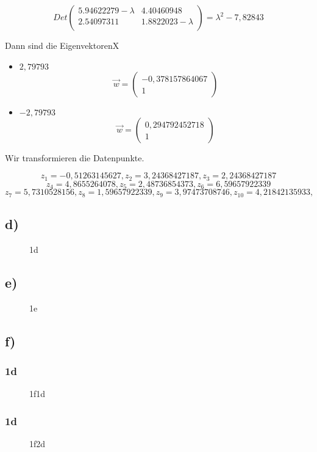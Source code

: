 \documentclass[a4paper,parskip=full-]{article}
\begin{document}
$$
Det\left(
\begin{array}{cc}
 5.94622279 - \lambda & 4.40460948 \\
 2.54097311           & 1.8822023 - \lambda \\
\end{array}
\right) = \lambda^2-7,82843
$$

Dann sind die EigenvektorenX

\begin{itemize}
\item $2,79793$
$$
\vec{w} = 
\begin{pmatrix} -0,378157864067 \\ 1 \end{pmatrix}
$$
\item $-2,79793$
$$
\vec{w} = 
\begin{pmatrix} 0,294792452718 \\ 1 \end{pmatrix}
$$
\end{itemize}

Wir transformieren die Datenpunkte.

$$
z_1
 = 
-0,51263145627, 
z_2
 = 
3,24368427187,
z_3 
 = 
2,24368427187 
$$
$$
z_4
 = 
4,8655264078,
z_5
 = 
2,48736854373,
z_6
 = 
6,59657922339 $$ $$
z_7
 = 
5,7310528156,
z_8
 = 
1,59657922339,
z_9
 = 
3,97473708746,
z_{10}
 = 
4,21842135933,
$$

\subsection{d)}

\begin{figure}[H]
    \def\svgwidth{\columnwidth}
	
	\label{fig:1d}
	\caption{1d}
\end{figure}

\subsection{e)}

\begin{figure}[H]
    \def\svgwidth{\columnwidth}
	
	\label{fig:1e}
	\caption{1e}
\end{figure}

\subsection{f)}

\subsubsection{1d}

\begin{figure}[H]
    \def\svgwidth{\columnwidth}
	
	\label{fig:1f1d}
	\caption{1f1d}
\end{figure}

\subsubsection{1d}

\begin{figure}[H]
    \def\svgwidth{\columnwidth}
	
	\label{fig:1f2d}
	\caption{1f2d}
\end{figure}
\end{document}

